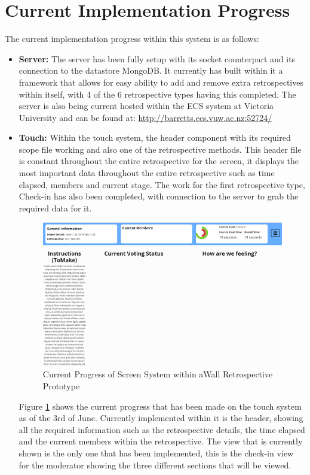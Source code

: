 \documentclass[11pt
              , a4paper
              , twoside
              , openright
              ]{report}
\begin{document}
\section{Current Implementation Progress}
The current implementation progress within this system is as follows:
\begin{itemize}
	\item \textbf{Server:} The server has been fully setup with its socket counterpart and its connection to the datastore MongoDB. It currently has built within it a framework that allows for easy ability to add and remove extra retrospectives within itself, with 4 of the 6 retrospective types having this completed. The server is also being current hosted within the ECS system at Victoria University and can be found at: \url{http://barretts.ecs.vuw.ac.nz:52724/}
	\item \textbf{Touch:} Within the touch system, the header component with its required scope file working and also one of the retrospective methods. This header file is constant throughout the entire retrospective for the screen, it displays the most important data throughout the entire retrospective such as time elapsed, members and current stage. The work for the first retrospective type, Check-in has also been completed, with connection to the server to grab the required data for it. 
	\begin{figure}[ht]
		\centering
		\includegraphics{moderator_progress}
		\caption{Current Progress of Screen System within aWall Retrospective Prototype} \label{fig:modProgress}
	\end{figure}

	Figure \ref{fig:modProgress} shows the current progress that has been made on the touch system as of the 3rd of June. Currently implemented within it is the header, showing all the required information such as the retrospective details, the time elapsed and the current members within the retrospective. The view that is currently shown is the only one that has been implemented, this is the check-in view for the moderator showing the three different sections that will be viewed.
	

\end{itemize}
\end{document}
